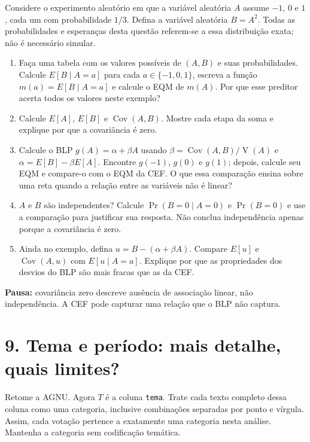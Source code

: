 \documentclass[
  brazilian,
  11pt,
  a4paper]{article}
\providecommand{\tightlist}{%
  \setlength{\itemsep}{0pt}\setlength{\parskip}{0pt}}
\begin{document}
Considere o experimento aleatório em que a variável aleatória \(A\)
assume \(-1\), \(0\) e \(1\), cada um com probabilidade \(1/3\). Defina
a variável aleatória \(B=A^2\). Todas as probabilidades e esperanças
desta questão referem-se a essa distribuição exata; não é necessário
simular.

\begin{enumerate}
\def\labelenumi{\alph{enumi}.}
\tightlist
\item
  Faça uma tabela com os valores possíveis de \((A,B)\) e suas
  probabilidades. Calcule \(E[B\mid A=a]\) para cada \(a\in\{-1,0,1\}\),
  escreva a função \(m(a)=E[B\mid A=a]\) e calcule o EQM de \(m(A)\).
  Por que esse preditor acerta todos os valores neste exemplo?
\item
  Calcule \(E[A]\), \(E[B]\) e \(\operatorname{Cov}(A,B)\). Mostre cada
  etapa da soma e explique por que a covariância é zero.
\item
  Calcule o BLP \(g(A)=\alpha+\beta A\) usando
  \(\beta=\operatorname{Cov}(A,B)/\operatorname{V}(A)\) e
  \(\alpha=E[B]-\beta E[A]\). Encontre \(g(-1)\), \(g(0)\) e \(g(1)\);
  depois, calcule seu EQM e compare-o com o EQM da CEF. O que essa
  comparação ensina sobre uma reta quando a relação entre as variáveis
  não é linear?
\item
  \(A\) e \(B\) são independentes? Calcule \(\Pr(B=0\mid A=0)\) e
  \(\Pr(B=0)\) e use a comparação para justificar sua resposta. Não
  conclua independência apenas porque a covariância é zero.
\item
  Ainda no exemplo, defina \(u=B-(\alpha+\beta A)\). Compare \(E[u]\) e
  \(\operatorname{Cov}(A,u)\) com \(E[u\mid A=a]\). Explique por que as
  propriedades dos desvios do BLP são mais fracas que as da CEF.
\end{enumerate}

\textbf{Pausa:} covariância zero descreve ausência de associação linear,
não independência. A CEF pode capturar uma relação que o BLP não
captura.

\newpage

\section{9. Tema e período: mais detalhe, quais
limites?}\label{tema-e-peruxedodo-mais-detalhe-quais-limites}

Retome a AGNU. Agora \(T\) é a coluna \texttt{tema}. Trate cada texto
completo dessa coluna como uma categoria, inclusive combinações
separadas por ponto e vírgula. Assim, cada votação pertence a exatamente
uma categoria nesta análise. Mantenha a categoria sem codificação
temática.
\end{document}
